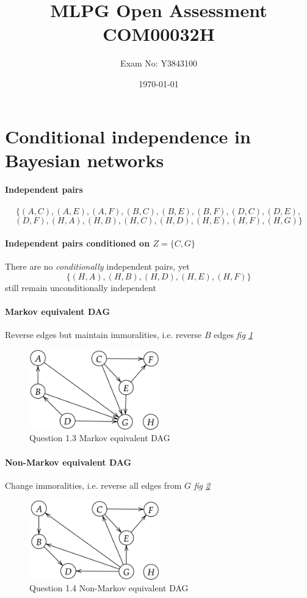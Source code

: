 \documentclass[11pt,a4paper,titlepage]{article}
\title{MLPG Open Assessment COM00032H}
\author{Exam No: Y3843100}
\date{\today}
\begin{document}
\maketitle


\section{Conditional independence in Bayesian networks}

\paragraph{Independent pairs}
\[\{(A,C),(A,E),(A,F),(B,C),(B,E),(B,F),(D,C),(D,E),\]
  \[(D,F),(H,A),(H,B),(H,C),(H,D),(H,E),(H,F),(H,G)\}\]

\paragraph{Independent pairs conditioned on \(Z = \{C,G\}\)}
There are no \textit{conditionally} independent pairs, yet
\[\{(H,A),(H,B),(H,D),(H,E),(H,F)\}\]
still remain unconditionally independent

\paragraph{Markov equivalent DAG}
Reverse edges but maintain immoralities, i.e. reverse \(B\) edges \textit{fig \ref{fig:1.3}}

\begin{figure}[htb]
  \centering
    \includegraphics[width=0.5\textwidth]{../q1/fig13.png}
    \caption{Question 1.3 Markov equivalent DAG}
  \label{fig:1.3}
\end{figure}

\paragraph{Non-Markov equivalent DAG}
Change immoralities, i.e. reverse all edges from \(G\) \textit{fig \ref{fig:1.4}}
\begin{figure}[htb]
  \centering
    \includegraphics[width=0.5\textwidth]{../q1/fig14.png}
    \caption{Question 1.4 Non-Markov equivalent DAG}
  \label{fig:1.4}
\end{figure}
\end{document}
